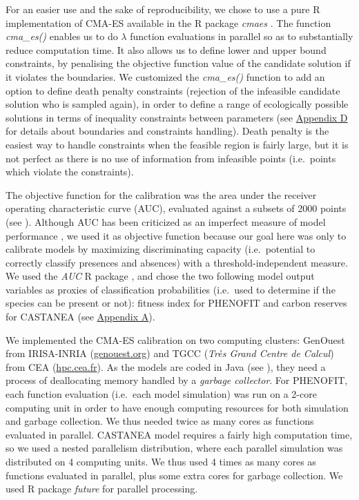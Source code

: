 For an easier use and the sake of reproducibility, we chose to use a
pure R implementation of CMA-ES available in the R package \emph{cmaes}
\citep{Trautmann2011}.
The function \emph{cma\_es()} enables us to do \(\lambda\) function
evaluations in parallel so as to substantially reduce computation time.
It also allows us to define lower and upper bound constraints, by
penalising the objective function value of the candidate solution if it
violates the boundaries. We customized the \emph{cma\_es()} function to
add an option to define death penalty constraints (rejection of the
infeasible candidate solution who is sampled again), in order to define
a range of ecologically possible solutions in terms of inequality
constraints between parameters (see
\hyperref[chap1:appendixD]{Appendix D} for details about boundaries
and constraints handling). Death penalty is the easiest way to handle
constraints when the feasible region is fairly large, but it is not
perfect as there is no use of information from infeasible points
(i.e.~points which violate the constraints).

The objective function for the calibration was the area under the
receiver operating characteristic curve (AUC), evaluated against a
subsets of 2000 points (see ). Although AUC has been criticized as an imperfect
measure of model performance \citep{Lobo2008, Leroy2018}, we used it as objective function because our goal here was
only to calibrate models by maximizing discriminating capacity
(i.e.~potential to correctly classify presences and absences) with a
threshold-independent measure. We used the \emph{AUC} R package
\citep{Ballings2013},
and chose the two following model output variables as proxies of
classification probabilities (i.e.~used to determine if the species can
be present or not): fitness index for PHENOFIT and carbon reserves for
CASTANEA (see \hyperref[chap1:appendixA]{Appendix A}).

We implemented the CMA-ES calibration on two computing clusters:
GenOuest from IRISA-INRIA
(\href{https://www.genouest.org}{genouest.org}) and TGCC (\emph{Très
Grand Centre de Calcul}) from CEA
(\href{http://www-hpc.cea.fr/fr/complexe/tgcc.htm}{hpc.cea.fr}). As the
models are coded in Java (see ), they need a process of deallocating memory
handled by a \emph{garbage collector}. For PHENOFIT, each function
evaluation (i.e.~each model simulation) was run on a 2-core computing
unit in order to have enough computing resources for both simulation and
garbage collection. We thus needed twice as many cores as functions
evaluated in parallel. CASTANEA model requires a fairly high computation
time, so we used a nested parallelism distribution, where each parallel
simulation was distributed on 4 computing units. We thus used 4 times as
many cores as functions evaluated in parallel, plus some extra cores for
garbage collection. We used R package \emph{future}
\citep{Bengtsson2021} for parallel
processing.

